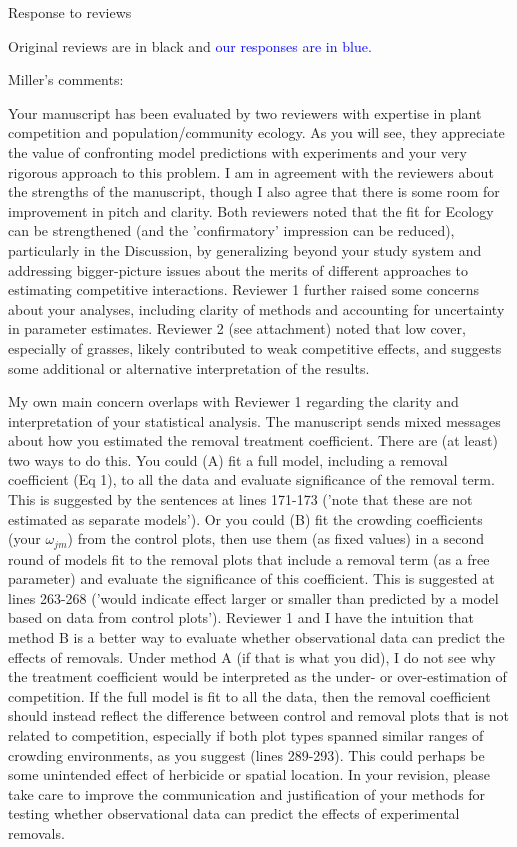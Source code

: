 \documentclass[12pt]{article}
\newcommand{\response}{\textcolor{blue}}
\begin{document}
 
\centerline{\large{Response to reviews}} 

\large{Original reviews are in black and \response{our responses are in blue.}
\normalsize 

Miller's comments: 

Your manuscript has been evaluated by two reviewers with expertise in plant competition and population/community ecology. As you will see, they appreciate the value of confronting model predictions with experiments and your very rigorous approach to this problem. I am in agreement with the reviewers about the strengths of the manuscript, though I also agree that there is some room for improvement in pitch and clarity. Both reviewers noted that the fit for Ecology can be strengthened (and the 'confirmatory' impression can be reduced), particularly in the Discussion, by generalizing beyond your study system and addressing bigger-picture issues about the merits of different approaches to estimating competitive interactions. Reviewer 1 further raised some concerns about your analyses, including clarity of methods and accounting for uncertainty in parameter estimates. Reviewer 2 (see attachment) noted that low cover, especially of grasses, likely contributed to weak competitive effects, and suggests some additional or alternative interpretation of the results. 

My own main concern overlaps with Reviewer 1 regarding the clarity and interpretation of your statistical analysis. The manuscript sends mixed messages about how you estimated the removal treatment coefficient. There are (at least) two ways to do this. You could (A) fit a full model, including a removal coefficient (Eq 1), to all the data and evaluate significance of the removal term. This is suggested by the sentences at lines 171-173 ('note that these are not estimated as separate models'). Or you could (B) fit the crowding coefficients (your $\omega_{jm}$) from the control plots, then use them (as fixed values) in a second round of models fit to the removal plots that include a removal term (as a free parameter) and evaluate the significance of this coefficient. This is suggested at lines 263-268 ('would indicate effect larger or smaller than predicted by a model based on data from control plots'). Reviewer 1 and I have the intuition that method B is a better way to evaluate whether observational data can predict the effects of removals. Under method A (if that is what you did), I do not see why the treatment coefficient would be interpreted as the under- or over-estimation of competition. If the full model is fit to all the data, then the removal coefficient should instead reflect the difference between control and removal plots that is not related to competition, especially if both plot types spanned similar ranges of crowding environments, as you suggest (lines 289-293). This could perhaps be some unintended effect of herbicide or spatial location. In your revision, please take care to improve the communication and justification of your methods for testing whether observational data can predict the effects of experimental removals. 

}
\end{document}

